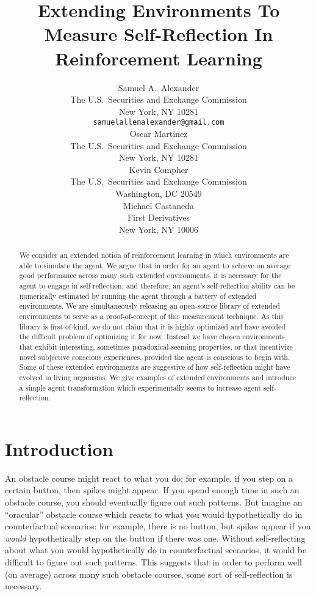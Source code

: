 \documentclass{article}
\title{Extending Environments To Measure Self-Reflection In Reinforcement Learning}
\author{
  Samuel A.~Alexander\\
  The U.S.\ Securities and Exchange Commission\\
  New York, NY 10281\\
  \texttt{samuelallenalexander@gmail.com}\\
  \And
  Oscar Martinez\\
  The U.S.\ Securities and Exchange Commission\\
  New York, NY 10281\\
  \And
  Kevin Compher\\
  The U.S.\ Securities and Exchange Commission\\
  Washington, DC 20549\\
  \And
  Michael Castaneda\\
  First Derivatives\\
  New York, NY 10006\\
}
\begin{document}
\maketitle

\begin{abstract}
  We consider an extended notion
  of reinforcement learning in which environments are able
  to simulate the agent. We argue that in order for an agent to achieve
  on average good performance across many such extended environments,
  it is necessary for the agent to engage in self-reflection, and therefore,
  an agent's self-reflection ability can be numerically estimated by running
  the agent through a battery of extended environments.
  We are simultaneously releasing an open-source library of extended
  environments to serve as a proof-of-concept of this measurement technique.
  As this library is first-of-kind, we do not claim that it is highly
  optimized and have avoided the difficult problem of optimizing it for now.
  Instead we have chosen environments that exhibit interesting, sometimes
  paradoxical-seeming properties, or that incentivize
  novel subjective conscious experiences, provided the agent is conscious
  to begin with. Some of these extended environments
  are suggestive of how self-reflection might have evolved in living organisms.
  We give examples of extended environments and introduce a simple agent
  transformation which experimentally seems to increase agent self-reflection.
\end{abstract}

\section{Introduction}

An obstacle course might react to what you do: for example, if you step on a certain
button, then spikes might appear. If you spend enough time in such an obstacle course,
you should eventually figure out such patterns.
But imagine an ``oracular'' obstacle course which reacts to
what you would hypothetically do in counterfactual scenarios: for example, there is
no button, but spikes appear
if you \emph{would} hypothetically step on the button if there was one. Without
self-reflecting about what you would hypothetically do in counterfactual scenarios, it
would be difficult to figure out such patterns. This suggests that in order to perform
well (on average) across many such obstacle courses, some sort of self-reflection is
necessary.
\end{document}

